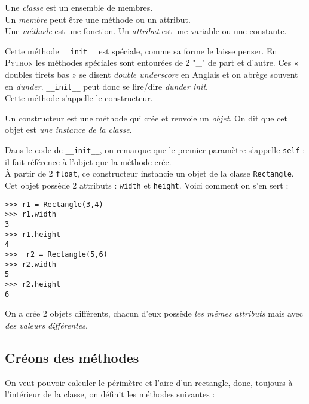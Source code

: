 \documentclass[a4paper,10pt,cours,firamath]{nsi}
\begin{document}
\begin{definition}
    Une \textit{classe} est un ensemble de membres.\\
    Un \textit{membre} peut être une méthode ou un attribut.\\
    Une \textit{méthode} est une fonction.
    Un \textit{attribut} est une variable ou une constante.
\end{definition}

Cette méthode \texttt{__init__} est spéciale, comme sa forme le laisse penser. En \textsc{Python} les méthodes spéciales sont entourées de 2 "\_" de part et d'autre. Ces « doubles tirets bas » se disent \textit{double underscore} en Anglais et on abrège souvent en \textit{dunder}. \texttt{__init__} peut donc se lire/dire \textit{dunder init}.\\
Cette méthode s'appelle le constructeur.
\begin{definition}[ : constructeur]
    Un constructeur est une méthode qui crée et renvoie un \textit{objet}. On dit que cet objet est \textit{une instance de la classe}.
\end{definition}

Dans le code de \texttt{__init__}, on remarque que le premier paramètre s'appelle \texttt{self} : il fait référence à l'objet que la méthode crée.\\
À partir de 2 \texttt{float}, ce constructeur instancie un objet de la classe \texttt{Rectangle}. Cet objet possède 2 attributs : \texttt{width} et \texttt{height}. Voici comment on s'en sert :

\begin{pyc}
    \begin{verbatim}
>>> r1 = Rectangle(3,4)
>>> r1.width
3
>>> r1.height
4
>>>  r2 = Rectangle(5,6)
>>> r2.width
5
>>> r2.height
6
        \end{verbatim}
\end{pyc}
On a crée 2 objets différents, chacun d'eux possède \textit{les mêmes attributs} mais avec \textit{des valeurs différentes}.

\subsection{Créons des méthodes}

On veut pouvoir calculer le périmètre et l'aire d'un rectangle, donc, toujours à l'intérieur de la classe, on définit les méthodes suivantes :
\end{document}
